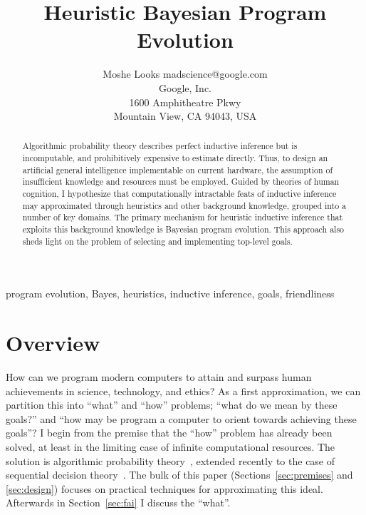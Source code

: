 \documentclass[twoside,11pt]{article}
\begin{document}
 \sloppy
\title{Heuristic Bayesian Program Evolution}
\author{\name Moshe Looks \email madscience@google.com \\
       \addr Google, Inc. \\
       1600 Amphitheatre Pkwy \\
       Mountain View, CA 94043, USA}
\maketitle

\begin{abstract}
  Algorithmic probability theory describes perfect inductive inference but is
  incomputable, and prohibitively expensive to estimate directly. Thus, to
  design an artificial general intelligence implementable on current hardware,
  the assumption of insufficient knowledge and resources must be
  employed. Guided by theories of human cognition, I hypothesize that
  computationally intractable feats of inductive inference may approximated
  through heuristics and other background knowledge, grouped into a number of
  key domains. The primary mechanism for heuristic inductive inference that
  exploits this background knowledge is Bayesian program evolution. This
  approach also sheds light on the problem of selecting and implementing
  top-level goals.
\end{abstract}

\begin{keywords}
  program evolution, Bayes, heuristics, inductive inference, goals,
  friendliness
\end{keywords}

\section{Overview}

How can we program modern computers to attain and surpass human achievements in
science, technology, and ethics? As a first approximation, we can partition
this into ``what'' and ``how'' problems; ``what do we mean by these goals?''
and ``how may be program a computer to orient towards achieving these goals''?
I begin from the premise that the ``how'' problem has already been solved, at
least in the limiting case of infinite computational resources. The solution is
algorithmic probability theory~\cite{Solomonoff}, extended recently to the case
of sequential decision theory~\cite{Hutter}. The bulk of this paper
(Sections~\ref{sec:premises} and \ref{sec:design}) focuses on practical
techniques for approximating this ideal. Afterwards in Section~\ref{sec:fai} I
discuss the ``what''.
\end{document}
